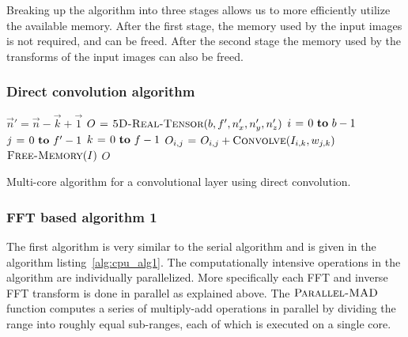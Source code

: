 \documentclass[conference]{IEEEtran}
\begin{document}
Breaking up the algorithm into three stages allows us to more
efficiently utilize the available memory.  After the first stage, the
memory used by the input images is not required, and can be freed.
After the second stage the memory used by the transforms of the input
images can also be freed.

\subsubsection{Direct convolution algorithm}

\begin{algorithm}
  {\small
  \begin{codebox}
    \li $\vec{n}' = \vec{n} - \vec{k} + \vec{1}$
    \li $O \mathrel{\hspace{1pt}=\hspace{1pt}} \textnormal{\scshape5D-Real-Tensor}(b,f',n'_x,n'_y,n'_z)$
    \li {} $i \gets 0 \To b-1$
    \li   \Do {} $j \gets 0 \To f'-1$
    \li     \Do \For $k \gets 0 \To f-1$
    \li     \Do $O_{i,j} \mathrel{\hspace{1pt}=\hspace{1pt}} O_{i,j} + \textnormal{\scshape Convolve}(I_{i,k},w_{j,k})$
    \End \End \End
    \li $\textnormal{\scshape Free-Memory}(I)$
    \li \Return $O$
  \end{codebox}
  }

  \caption{Multi-core algorithm for a convolutional layer using direct
  convolution.}
  \label{alg:cpu_direct}
\end{algorithm}

\subsubsection{FFT based algorithm 1}

The first algorithm is very similar to the serial algorithm and is
given in the algorithm listing~\ref{alg:cpu_alg1}.  The computationally
intensive operations in the algorithm are individually parallelized.
More specifically each FFT and inverse FFT transform is done in
parallel as explained above.  The $\textnormal{\scshape Parallel-MAD}$ function
computes a series of multiply-add operations in parallel by dividing
the range into roughly equal sub-ranges, each of which is executed on
a single core.
\end{document}

